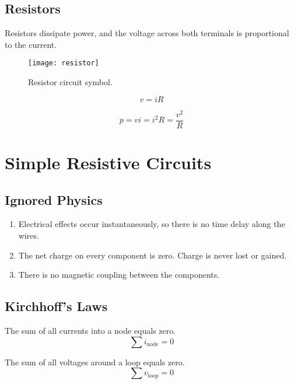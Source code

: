 \documentclass{article}
\begin{document}
\subsection{Resistors}
\begin{definition}[Resistor]
    Resistors dissipate power, and the voltage across both terminals is proportional to the current.
\end{definition}
\begin{figure}[H]
    \centering
    \texttt{[image: resistor]}
    \caption{Resistor circuit symbol.}
\end{figure}
\begin{theorem}
    \begin{equation*}
        v = iR
    \end{equation*}
\end{theorem}
\begin{corollary}
    \begin{equation*}
        p = vi = i^2 R = \frac{v^2}{R}
    \end{equation*}
\end{corollary}
\newpage
\section{Simple Resistive Circuits}
\subsection{Ignored Physics}
\begin{enumerate}
    \item Electrical effects occur instantaneously, so there is no time delay along the wires.
    \item The net charge on every component is zero. Charge is never lost or gained.
    \item There is no magnetic coupling between the components.
\end{enumerate}
\subsection{Kirchhoff's Laws}
\begin{theorem}
    The sum of all currents into a node equals zero.
    \begin{equation*}
        \sum i_{\mathrm{node}} = 0
    \end{equation*}
\end{theorem}
\begin{theorem}
    The sum of all voltages around a loop equals zero.
    \begin{equation*}
        \sum v_{\mathrm{loop}} = 0
    \end{equation*}
\end{theorem}
\end{document}
